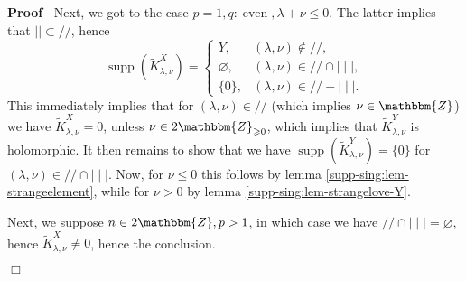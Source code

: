 \documentclass[12pt]{article}
\newcommand{\nin}{\not\in}
\newcommand{\tmop}[1]{\ensuremath{\operatorname{#1}}}
\renewenvironment{proof}{\noindent\textbf{Proof\ }}{\hspace*{\fill}$\Box$\medskip}
\theoremstyle{remark}
\begin{document}
\begin{proof}
  Next, we got to the case $p = 1, q : \tmop{even}, \lambda + \nu \leqslant
  0$. The latter implies that $\mid \mid \subset / /$, hence
  \[ \tmop{supp} (\tilde{K}_{\lambda, \nu}^X) = \left\{ \begin{array}{ll}
       Y, & (\lambda, \nu) \nin / /,\\
       \varnothing, & (\lambda, \nu) \in / / \cap \mid \mid \mid,\\
       \{ 0 \}, & (\lambda, \nu) \in / / - \mid \mid \mid .
     \end{array} \right. \]
  This immediately implies that for $(\lambda, \nu) \in / /$ (which implies
  $\nu \in \mathbbm{Z}$) we have $\tilde{K}_{\lambda, \nu}^X = 0$, unless $\nu
  \in 2\mathbbm{Z}_{\geqslant 0}$, which implies that $\tilde{K}_{\lambda,
  \nu}^Y$ is holomorphic. It then remains to show that we have $\tmop{supp}
  (\tilde{K}_{\lambda, \nu}^Y) = \{ 0 \}$ for $(\lambda, \nu) \in / / \cap
  \mid \mid \mid$. Now, for $\nu \leqslant 0$ this follows by lemma
  \ref{supp-sing:lem-strangeelement}, while for $\nu > 0$ by lemma
  \ref{supp-sing:lem-strangelove-Y}.
  
  Next, we suppose $n \in 2\mathbbm{Z}, p > 1$, in which case we have $/ /
  \cap \mid \mid \mid = \varnothing$, hence $\tilde{K}_{\lambda, \nu}^X \neq
  0$, hence the conclusion.
  

\end{proof}
\end{document}

